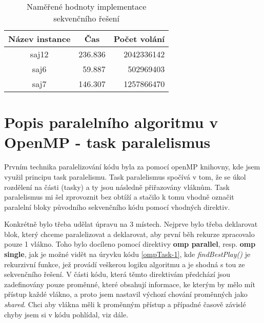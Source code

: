 \documentclass{article} \oddsidemargin=-5mm
\begin{document}
\begin{table}[h]
\centering
\begin{tabular}{|c|r|r|}
\hline
\rowcolor[HTML]{C0C0C0} 
\textbf{Název instance} & \multicolumn{1}{c|}{\cellcolor[HTML]{C0C0C0}\textbf{Čas}} & \multicolumn{1}{c|}{\cellcolor[HTML]{C0C0C0}\textbf{Počet volání}} \\ \hline
saj12             & 236.836                                        & 2042336142                                                         \\ \hline
saj6              & 59.887                                                    & 502969403                                                          \\ \hline
saj7              & 146.307                                        & 1257866470                                                         \\ \hline
\end{tabular}
\caption{Naměřené hodnoty implementace sekvenčního řešení}
\label{table-seq}
\end{table}


\section{Popis paralelního algoritmu v OpenMP - task paralelismus}

Prvním technika paralelizování kódu byla za pomocí openMP knihovny, kde jsem využil principu task paralelismu. Task paralelismus spočívá v tom, že se úkol rozdělení na části (tasky) a ty jsou následně přiřazovány vláknům. Task paralelismus mi šel zprovoznit bez obtíží a stačilo k tomu vhodně označit paralelní bloky původního sekvenčního kódu pomocí vhodných direktiv.

Konkrétně bylo třeba udělat úpravu na 3 místech. Nejprve bylo třeba deklarovat blok, který chceme paralelizovat a deklarovat, aby první běh rekurze zpracovalo pouze 1 vlákno. Toho bylo docíleno pomocí direktivy \textbf{omp parallel}, resp. \textbf{omp single}, jak je možné vidět na úryvku kódu \ref{ompTask-1}, kde \textit{findBestPlay()} je rekurzivní funkce, jež provádí veškerou logiku algoritmu a je shodná s tou ze sekvenčního řešení. V části kódu, která těmto direktivám předchází jsou zadefinovány pouze proměnné, které obsahují informace, ke kterým by mělo mít přístup každé vlákno, a proto jsem nastavil výchozí chování proměnných jako \textit{shared}. Chci aby vlákna měli k proměnným přístup a případné časově závislé chyby jsem si v kódu pohlídal, viz dále.
\end{document}
